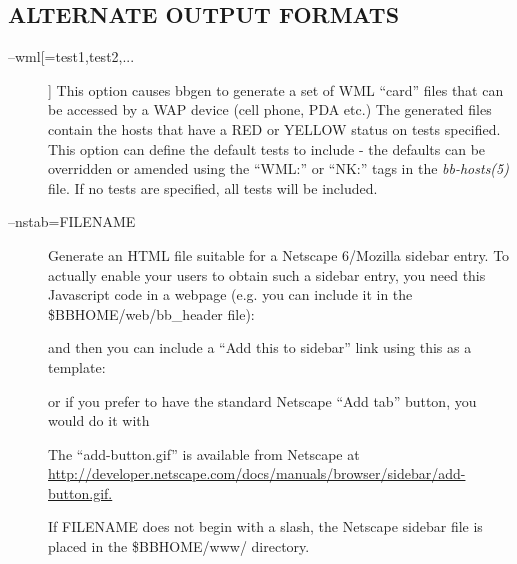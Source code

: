 \subsection{ALTERNATE OUTPUT FORMATS}


 \begin{description}

\item[--wml[=test1,test2,...]] This option causes bbgen to generate a
  set of WML ``card'' files that can be accessed by a WAP device (cell
  phone, PDA etc.) The generated files contain the hosts that have a
  RED or YELLOW status on tests specified. This option can define the
  default tests to include - the defaults can be overridden or amended
  using the ``WML:'' or ``NK:'' tags in the \emph{bb-hosts(5)}
  file. If no tests are specified, all tests will be included. 


 

\item[--nstab=FILENAME] Generate an HTML file suitable for a Netscape
  6/Mozilla sidebar entry. To actually enable your users to obtain
  such a sidebar entry, you need this Javascript code in a webpage
  (e.g. you can include it in the \$BBHOME/web/bb\_header file): 


% 
% 
% 
% 
% 
%

  and then you can include a ``Add this to sidebar'' link using this as a template: 




  or if you prefer to have the standard Netscape ``Add tab'' button, you would do it with 

%
%  
% 
% 
% 


  The ``add-button.gif'' is available from Netscape at
  \url{http://developer.netscape.com/docs/manuals/browser/sidebar/add-button.gif.}



  If FILENAME does not begin with a slash, the Netscape sidebar file is placed in the \$BBHOME/www/ directory. 



\end{description}
